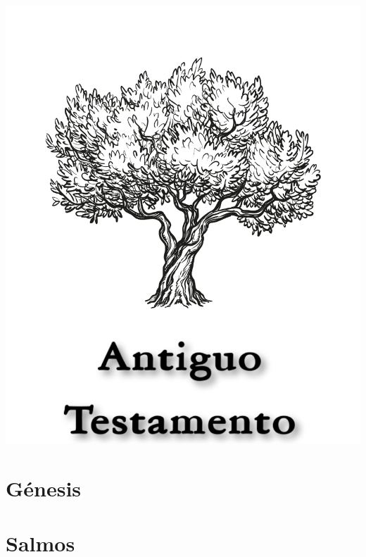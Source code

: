 \documentclass[14pt, b5paper, twoside]{extbook}
\begin{document}
\tableofcontents
\newpage

\null\vfill
\begin{center}
\begin{minipage}[c]{\textwidth}
  \begin{center}
  \includegraphics{AntiguoTestamentoTitulo.pdf}
  \end{center}
\end{minipage}
\end{center}
\null\vfill
\newpage

\pagestyle{bible}

\renewcommand{\cleardoublepage}{}
\renewcommand{\clearpage}{}

\chapter{Génesis}
\begin{multicols}{2}
  
\end{multicols}

\chapter{Salmos}
\begin{multicols}{2}
  
\end{multicols}
\end{document}

